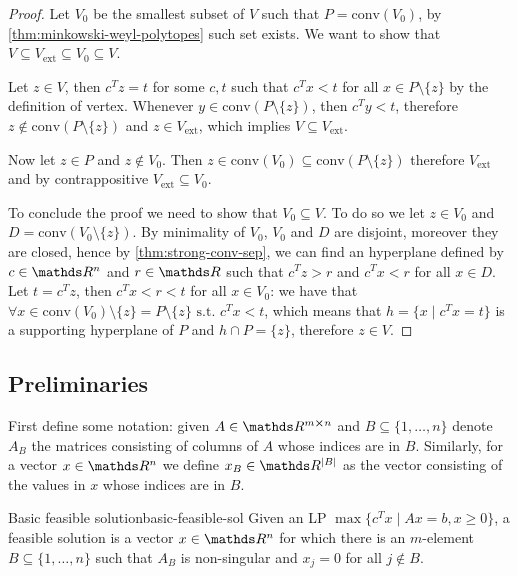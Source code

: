 \documentclass[12pt]{extarticle}
\begin{document}
\begin{proof}
	Let $V_0$ be the smallest subset of $V$ such that $P = \mathrm{conv}(V_0)$,
	by \cref{thm:minkowski-weyl-polytopes} such set exists.
	We want to show that $V \subseteq V_\text{ext} \subseteq V_0 \subseteq V$.

	Let $z \in V$, then $c^T z = t$ for some $c, t$ such that $c^T x < t$
	for all $x \in P \setminus \{z\}$ by the definition of vertex.
	Whenever $y \in \mathrm{conv}(P\setminus \{z\})$, then $c^T y < t$, therefore
	$z \notin \mathrm{conv}(P\setminus \{z\})$ and $z \in V_\text{ext}$,
	which implies $V \subseteq V_\text{ext}$.

	Now let $z \in P$ and $z \notin V_0$.
	Then $z \in \mathrm{conv}(V_0) \subseteq \mathrm{conv}(P \setminus \{z\})$
	therefore $V_\text{ext}$ and by contrappositive $V_\text{ext} \subseteq V_0$.

	To conclude the proof we need to show that $V_0 \subseteq V$. To do so we let $z \in V_0$
	and $D = \mathrm{conv}(V_0 \setminus \{z\})$. By minimality of $V_0$, $V_0$ and $D$ are disjoint,
	moreover they are closed, hence by \cref{thm:strong-conv-sep}, we can find an hyperplane defined
	by $c \in \R^n$ and $r \in \R$ such that $c^T z > r$ and $c^T x < r$ for all $x \in D$.
	Let $t = c^T z$, then $c^T x < r < t$ for all $x \in V_0$:
	we have that $\forall x \in \mathrm{conv}(V_0) \setminus \{z\} =
		P \setminus \{z\} \text{ s.t. } c^T x < t$,	which means that $h = \{ x \mid c^T x = t \}$
	is a supporting hyperplane of $P$ and $h \cap P = \{z\}$, therefore $z \in V$.
\end{proof}

\subsection{Preliminaries}

First define some notation: given $A \in \R^{m \cross n}$ and $B \subseteq \{1, \dots, n\}$ denote
$A_B$ the matrices consisting of columns of $A$ whose indices are in $B$.
Similarly, for a vector $x \in \R^n$ we define $x_B \in \R^\abs{B}$ as the vector consisting
of the values in $x$ whose indices are in $B$.

\begin{definition}{Basic feasible solution}{basic-feasible-sol}
	Given an LP $\max \{ c^T x \mid Ax = b, x\geq 0\}$, a feasible solution is a vector $x \in \R^n$
	for which there is an $m$-element $B \subseteq \{1, \dots, n\}$ such that $A_B$ is non-singular
	and $x_j = 0$ for all $j \notin B$.
\end{definition}
\end{document}
